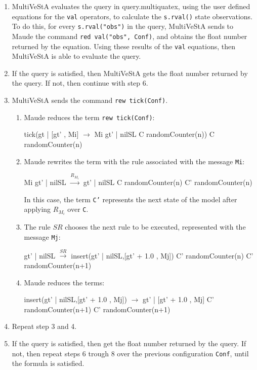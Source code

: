 \begin{enumerate}
\item MultiVeStA evaluates the query in query.multiquatex, using the user defined equations for the \texttt{val} operators, to calculate the \texttt{s.rval()} state observations. To do this, for every \texttt{s.rval("obs")} in the query, MultiVeStA sends to Maude the command \texttt{red val("obs", Conf)}, and obtains the float number returned by the equation. Using these results of the \texttt{val} equations, then MultiVeStA is able to evaluate the query.

\item If the query is satisfied, then MultiVeStA gets the float number returned by the query. If not, then continue with step 6.

\item MultiVeStA sends the command \texttt{rew tick(Conf)}.
    \begin{enumerate}
        \item Maude reduces the term \texttt{rew tick(Conf)}:
        \begin{maude}

tick({gt | [gt' , Mi]}     $\rightarrow$  Mi {gt' | nilSL }
     {C randomCounter(n)})    {C randomCounter(n)}\end{maude}
        \item Maude rewrites the term with the rule associated with the message \texttt{Mi}:
        \begin{maude}
        
Mi {gt' | nilSL}    $\xrightarrow{R_{M_i}}$ {gt' | nilSL }
{C randomCounter(n)}     {C'  randomCounter(n)}\end{maude}
        In this case, the term \texttt{C'} represents the next state of the model after applying $R_{M_i}$ over \texttt{C}.
        \item The rule $SR$ chooses the next rule to be executed, represented with the message \texttt{Mj}:
        \begin{maude}

{gt' | nilSL }        $\xrightarrow{SR}$   insert({gt' | nilSL},[gt' + 1.0 , Mj])
{C' randomCounter(n)}       {C' randomCounter(n+1)}\end{maude}
        
        \item Maude reduces the terms:
        \begin{maude}
        
insert({gt' | nilSL},[gt' + 1.0 , Mj]) $\rightarrow$ {gt' | [gt' + 1.0 , Mj]} 
{C' randomCounter(n+1)}                   {C' randomCounter(n+1)}\end{maude}
    \end{enumerate}

    \item Repeat step 3 and 4.
    
    \item If the query is satisfied, then get the float number returned by the query. If not, then repeat steps 6 trough 8 over the previous configuration \texttt{Conf}, until the formula is satisfied.
\end{enumerate}
